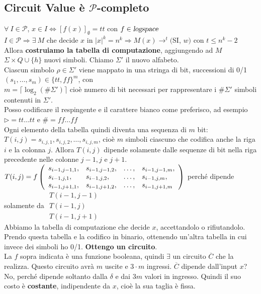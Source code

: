 \documentclass[10pt]{book}
\begin{document}
\subsection{Circuit Value è $\mathscr{P}$-completo}
$\forall\:I\in\mathscr{P}$, $x \in I \Leftrightarrow [f(x)]_\emptyset = tt$ con $f \in \textsl{logspace}$\\
$I\in\mathscr{P} \Rightarrow \exists\:M$ che decide $x$ in $|x|^k = n^k \Rightarrow M(x) \rightarrow^t ($SI, $w)$ con $t \leq n^k - 2$\\
Allora \textbf{costruiamo la tabella di computazione}, aggiungendo ad $M$ $\Sigma \times Q \cup \{h\}$ nuovi simboli. Chiamo $\Sigma'$ il nuovo alfabeto.\\
Ciascun simbolo $\rho \in \Sigma'$ viene mappato in una stringa di bit, successioni di 0/1 $(s_1,\ldots,s_m)\in\{tt, ff\}^m$, con\\$m = \lceil\log_2(\#\Sigma')\rceil$ cioè numero di bit necessari per rappresentare i $\#\Sigma'$ simboli contenuti in $\Sigma'$.\\
Posso codificare il respingente e il carattere bianco come preferisco, ad esempio $\triangleright = tt\ldots tt$ e $\# = ff\ldots ff$\\
Ogni elemento della tabella quindi diventa una sequenza di $m$ bit: $T(i, j) = s_{i,j,1}, s_{i,j,2},\ldots,s_{i,j,m}$, cioè $m$ simboli ciascuno che codifica anche la riga $i$ e la colonna $j$. Allora $T(i,j)$ dipende solamente dalle sequenze di bit nella riga precedente nelle colonne $j-1,j$ e $j+1$.\\
$T(i,j) = f\left( \begin{array}{l l l l}
	s_{i-1,j-1,1}, & s_{i-1,j-1,2}, &\ldots, &s_{i-1,j-1,m},\\
	s_{i-1,j,1}, &s_{i-1,j,2}, &\ldots, &s_{i-1,j,m},\\
	s_{i-1,j+1,1}, &s_{i-1,j+1,2},&\ldots, &s_{i-1,j+1,m}
\end{array}
\right)$
perché dipende solamente da $\begin{array}{l}
T(i-1, j-1)\\T(i-1,j)\\T(i-1,j+1)
\end{array}$\\
Abbiamo la tabella di computazione che decide $x$, accettandolo o rifiutandolo. Prendo questa tabella e la codifico in binario, ottenendo un'altra tabella in cui invece dei simboli ho 0/1. \textbf{Ottengo un circuito}.\\
La $f$ sopra indicata è una funzione booleana, quindi $\exists$ un circuito $\overline{C}$ che la realizza. Questo circuito avrà $m$ uscite e $3\cdot m$ ingressi. $\overline{C}$ dipende dall'input $x$? No, perché dipende soltanto dalla $\delta$ e dai $3m$ valori in ingresso. Quindi il suo costo è \textbf{costante}, indipendente da $x$, cioè la sua taglia è fissa.
\end{document}
